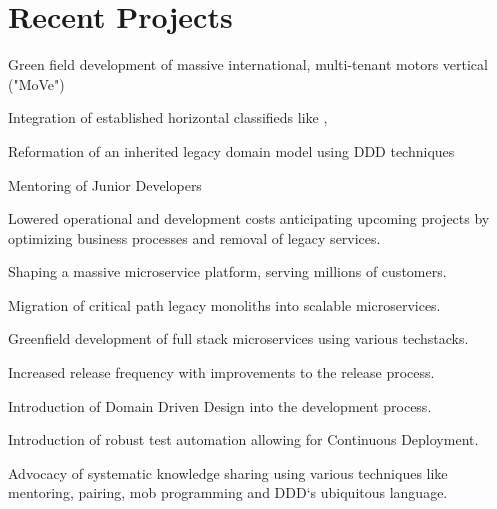 \documentclass[]{resume}
\begin{document}
\begin{minipage}[t]{0.32\textwidth}
%
%

\end{minipage}
\hfill
\begin{minipage}[t]{0.64\textwidth}


\section{Recent Projects}

\vspace{\topsep} %
\begin{tightemize}
\item Green field development of massive international, multi-tenant motors vertical ("MoVe")
\item Integration of established horizontal classifieds like \href{https://www.kijiji.ca}{}, \href{https://www.gumtree.com.au}{}
\item Reformation of an inherited legacy domain model using DDD techniques
\item Mentoring of Junior Developers
\end{tightemize}
\sectionsep

\begin{tightemize}\item Lowered operational and development costs anticipating upcoming projects by optimizing business processes and removal of legacy services.
\end{tightemize}
\sectionsep

\begin{tightemize}
\item Shaping a massive microservice platform, serving millions of customers.
\item Migration of critical path legacy monoliths into scalable microservices.
\item Greenfield development of full stack microservices using various techstacks.
\item Increased release frequency with improvements to the release process.
\item Introduction of Domain Driven Design into the development process.
\item Introduction of robust test automation allowing for Continuous Deployment.
\item Advocacy of systematic knowledge sharing using various techniques like mentoring, pairing, mob programming and DDD`s ubiquitous language.
\end{tightemize}
\sectionsep


\end{minipage}
\end{document}
